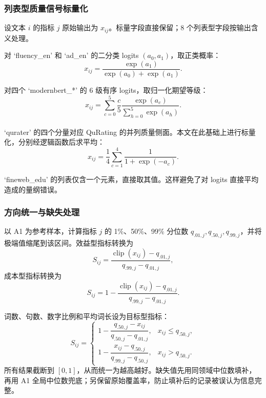 \documentclass[bwprint]{gmcmthesis}
\DeclareMathOperator{\clip}{clip}
\begin{document}
        \subsubsection{列表型质量信号标量化}  %
        设文本 $i$ 的指标 $j$ 原始输出为 $x_{ij}$。标量字段直接保留；8 个列表型字段按输出含义处理。

        对 `fluency\_en' 和 `ad\_en' 的二分类 logits $(a_0,a_1)$，取正类概率：
        \begin{equation}
        x_{ij}=\frac{\exp(a_1)}{\exp(a_0)+\exp(a_1)}.
        \label{eq:binary}
        \end{equation}
        
        对四个 `modernbert\_*' 的 6 级有序 logits，取归一化期望等级：
        \begin{equation}
        x_{ij}=\sum_{c=0}^{5}\frac{c}{5}
        \frac{\exp(a_c)}{\sum_{h=0}^{5}\exp(a_h)}.
        \label{eq:ordinal}
        \end{equation}
        
        `qurater' 的四个分量对应 QuRating 的并列质量侧面\textsuperscript{\cite{wettig2024qurating}}。本文在此基础上进行标量化，分别经逻辑函数后求平均：
        \begin{equation}
        x_{ij}=\frac{1}{4}\sum_{c=1}^{4}\frac{1}{1+\exp(-a_c)}.
        \label{eq:qurater}
        \end{equation}
        
        `fineweb\_edu' 的列表仅含一个元素，直接取其值。这样避免了对 logits 直接平均造成的量纲错误。


        \subsubsection{方向统一与缺失处理}   %
        以 A1 为参考样本，计算指标 $j$ 的 1\%、50\%、99\% 分位数 $q_{.01,j},q_{.50,j},q_{.99,j}$，并将极端值缩尾到该区间。效益型指标转换为
        \begin{equation}
        S_{ij}=\frac{\clip(x_{ij})-q_{.01,j}}{q_{.99,j}-q_{.01,j}},
        \label{eq:benefit}
        \end{equation}
        成本型指标转换为
        \begin{equation}
        S_{ij}=1-\frac{\clip(x_{ij})-q_{.01,j}}{q_{.99,j}-q_{.01,j}}.
        \label{eq:cost}
        \end{equation}
        
        词数、句数、数字比例和平均词长设为目标型指标：
        \begin{equation}
        S_{ij}=\begin{cases}
        1-\dfrac{q_{.50,j}-x_{ij}}{q_{.50,j}-q_{.01,j}},&x_{ij}\le q_{.50,j},\\[6pt]
        1-\dfrac{x_{ij}-q_{.50,j}}{q_{.99,j}-q_{.50,j}},&x_{ij}>q_{.50,j}.
        \end{cases}
        \label{eq:target}
        \end{equation}
        所有结果截断到 $[0,1]$，从而统一为越高越好。缺失值先用同领域中位数填补，再用 A1 全局中位数兜底；另保留原始覆盖率，防止填补后的记录被误认为信息完整。
        
\end{document}
